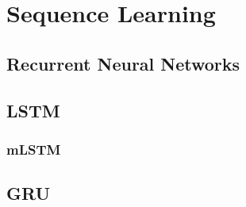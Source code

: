 \chapter{Sequence Learning}

\section{Recurrent Neural Networks}

\section{LSTM}

\subsection{mLSTM}

\section{GRU}
